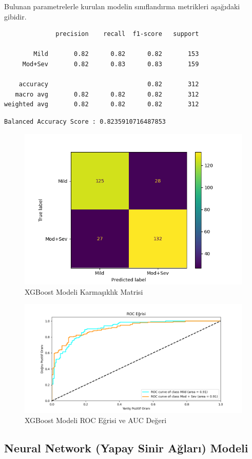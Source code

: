 \documentclass[12pt,twoside]{deuthesis}
\begin{document}
Bulunan parametrelerle kurulan modelin sınıflandırma metrikleri aşağıdaki gibidir.
\begin{verbatim}
              precision    recall  f1-score   support

        Mild       0.82      0.82      0.82       153
     Mod+Sev       0.82      0.83      0.83       159

    accuracy                           0.82       312
   macro avg       0.82      0.82      0.82       312
weighted avg       0.82      0.82      0.82       312
\end{verbatim}
\begin{verbatim}
Balanced Accuracy Score : 0.8235910716487853
\end{verbatim}
\begin{figure}

{\centering \includegraphics[width=1.05\linewidth,height=0.6\textheight]{figure/XGB_bin_conf} 

}

\caption{XGBoost Modeli Karmaşıklık Matrisi}\label{fig:unnamed-chunk-68}
\end{figure}
\begin{figure}

{\centering \includegraphics[width=1.05\linewidth,height=0.6\textheight]{figure/XGBClassifier_binary_roc} 

}

\caption{XGBoost Modeli ROC Eğrisi ve AUC Değeri}\label{fig:unnamed-chunk-69}
\end{figure}
\hypertarget{bin_nn}{%
\subsection{Neural Network (Yapay Sinir Ağları) Modeli}\label{bin_nn}}
\end{document}
